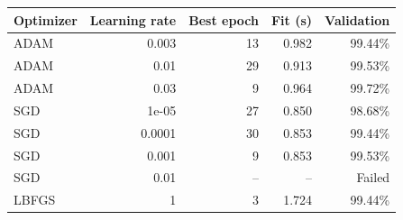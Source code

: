 \begin{center}\begin{tabular}{lrrrr}
\toprule
Optimizer & Learning rate & Best epoch & Fit (s) & Validation \\\midrule
ADAM & 0.003 & 13 & 0.982 & 99.44\% \\
ADAM & 0.01 & 29 & 0.913 & 99.53\% \\
ADAM & 0.03 & 9 & 0.964 & 99.72\% \\
SGD & 1e-05 & 27 & 0.850 & 98.68\% \\
SGD & 0.0001 & 30 & 0.853 & 99.44\% \\
SGD & 0.001 & 9 & 0.853 & 99.53\% \\
SGD & 0.01 & -- & -- & Failed \\
LBFGS & 1 & 3 & 1.724 & 99.44\% \\
\bottomrule\end{tabular}\end{center}
